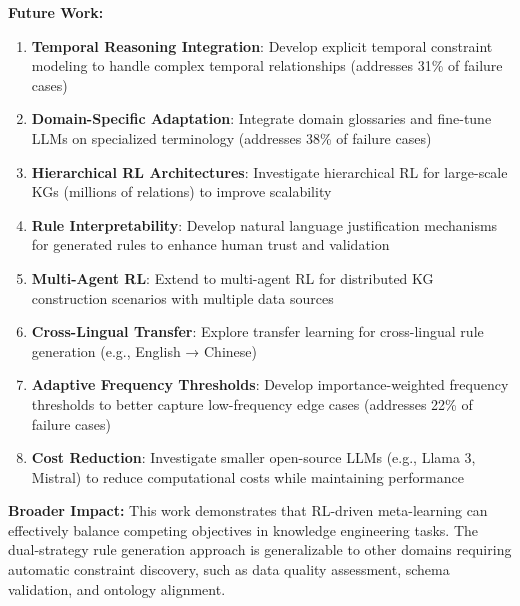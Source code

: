\documentclass[runningheads]{llncs}
\begin{document}
\textbf{Future Work:}
\begin{enumerate}
    \item \textbf{Temporal Reasoning Integration}: Develop explicit temporal constraint modeling to handle complex temporal relationships (addresses 31\% of failure cases)
    \item \textbf{Domain-Specific Adaptation}: Integrate domain glossaries and fine-tune LLMs on specialized terminology (addresses 38\% of failure cases)
    \item \textbf{Hierarchical RL Architectures}: Investigate hierarchical RL for large-scale KGs (millions of relations) to improve scalability
    \item \textbf{Rule Interpretability}: Develop natural language justification mechanisms for generated rules to enhance human trust and validation
    \item \textbf{Multi-Agent RL}: Extend to multi-agent RL for distributed KG construction scenarios with multiple data sources
    \item \textbf{Cross-Lingual Transfer}: Explore transfer learning for cross-lingual rule generation (e.g., English → Chinese)
    \item \textbf{Adaptive Frequency Thresholds}: Develop importance-weighted frequency thresholds to better capture low-frequency edge cases (addresses 22\% of failure cases)
    \item \textbf{Cost Reduction}: Investigate smaller open-source LLMs (e.g., Llama 3, Mistral) to reduce computational costs while maintaining performance
\end{enumerate}

\textbf{Broader Impact:}
This work demonstrates that RL-driven meta-learning can effectively balance competing objectives in knowledge engineering tasks. The dual-strategy rule generation approach is generalizable to other domains requiring automatic constraint discovery, such as data quality assessment, schema validation, and ontology alignment.
\end{document}
